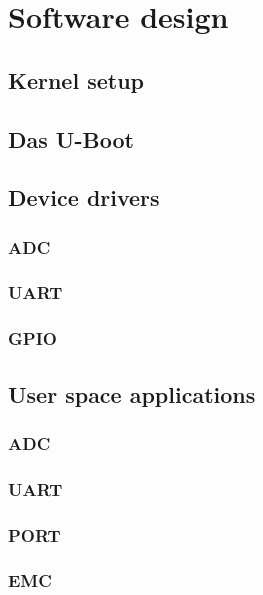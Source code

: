 \chapter{Software design}
\section{Kernel setup}
%

\section{Das U-Boot}
%

\section{Device drivers}
%

\subsection{ADC}

\subsection{UART}

\subsection{GPIO}

\section{User space applications}

\subsection{ADC}

\subsection{UART}

\subsection{PORT}

\subsection{EMC}



